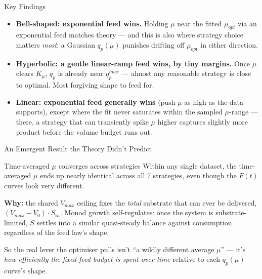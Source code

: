 \documentclass[aspectratio=169, 11pt]{beamer}
\begin{document}
\begin{frame}{Key Findings}
  \begin{itemize}
    \item \textbf{Bell-shaped: exponential feed wins.} Holding $\mu$ near the fitted
      $\mu_{opt}$ via an exponential feed matches theory --- and this is also where
      strategy choice matters \textit{most}: a Gaussian $q_p(\mu)$ punishes drifting
      off $\mu_{opt}$ in either direction.
    \item \textbf{Hyperbolic: a gentle linear-ramp feed wins, by tiny margins.} Once
      $\mu$ clears $K_\mu$, $q_p$ is already near $q_p^{max}$ --- almost any
      reasonable strategy is close to optimal. Most forgiving shape to feed for.
    \item \textbf{Linear: exponential feed generally wins} (push $\mu$ as high as the
      data supports), except where the fit never saturates within the sampled
      $\mu$-range --- there, a strategy that can transiently spike $\mu$ higher
      captures slightly more product before the volume budget runs out.
  \end{itemize}
\end{frame}

\begin{frame}{An Emergent Result the Theory Didn't Predict}
  \begin{block}{Time-averaged $\mu$ converges across strategies}
    Within any single dataset, the time-averaged $\mu$ ends up nearly identical
    across all 7 strategies, even though the $F(t)$ curves look very different.
  \end{block}

  \vspace{0.3cm}
  \textbf{Why:} the shared $V_{max}$ ceiling fixes the \textit{total} substrate that
  can ever be delivered, $(V_{max}-V_0)\cdot S_{in}$. Monod growth self-regulates: once
  the system is substrate-limited, $S$ settles into a similar quasi-steady balance
  against consumption regardless of the feed law's shape.

  \vspace{0.3cm}
  So the real lever the optimiser pulls isn't ``a wildly different average $\mu$''
  --- it's \textit{how efficiently the fixed feed budget is spent over time}
  relative to each $q_p(\mu)$ curve's shape.
\end{frame}
\end{document}

